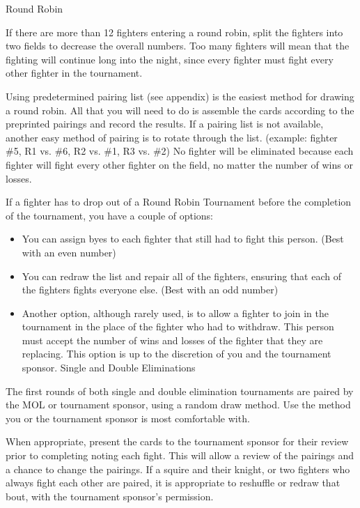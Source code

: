\documentclass{article}
\begin{document}
Round Robin

If there are more than 12 fighters entering a round robin, split the fighters into two fields to decrease the
overall numbers. Too many fighters will mean that the fighting will continue long into the night, since
every fighter must fight every other fighter in the tournament.

Using predetermined pairing list (see appendix) is the easiest method for drawing a round robin. All that
you will need to do is assemble the cards according to the preprinted pairings and record the results. If a
pairing list is not available, another easy method of pairing is to rotate through the list. (example: fighter
\#5, R1 vs. \#6, R2 vs. \#1, R3 vs. \#2) No fighter will be eliminated because each fighter will fight every
other fighter on the field, no matter the number of wins or losses.

If a fighter has to drop out of a Round Robin Tournament before the completion of the tournament, you
have a couple of options:
\begin{itemize}
\item You can assign byes to each fighter that still had to fight this person. (Best with an even number)

\item You can redraw the list and repair all of the fighters, ensuring that each of the fighters fights everyone
else. (Best with an odd number)

\item Another option, although rarely used, is to allow a fighter to join in the tournament in the place of the
fighter who had to withdraw. This person must accept the number of wins and losses of the fighter that
they are replacing. This option is up to the discretion of you and the tournament sponsor.
Single and Double Eliminations
\end{itemize}
The first rounds of both single and double elimination tournaments are paired by the MOL or tournament
sponsor, using a random draw method. Use the method you or the tournament sponsor is most
comfortable with.

When appropriate, present the cards to the tournament sponsor for their review prior to completing noting
each fight. This will allow a review of the pairings and a chance to change the pairings. If a squire and
their knight, or two fighters who always fight each other are paired, it is appropriate to reshuffle or redraw
that bout, with the tournament sponsor’s permission.
\end{document}
